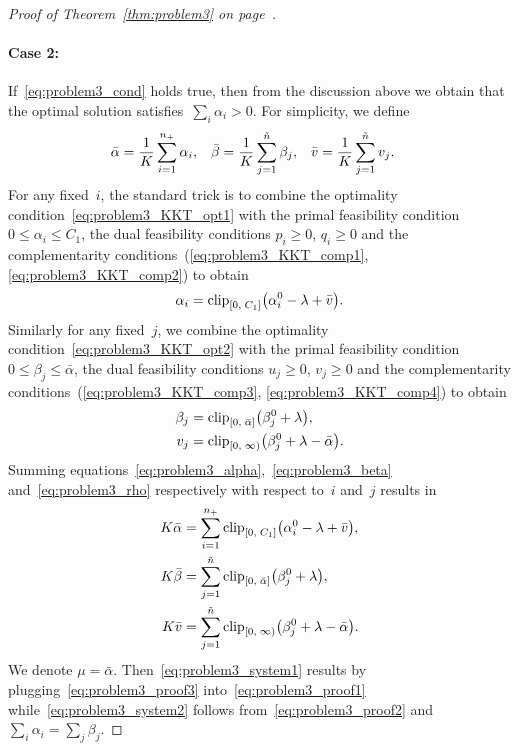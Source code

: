 \begin{proof}[Proof of Theorem~\ref{thm:problem3} on page~\pageref{thm:problem3}]
  \paragraph*{Case 2:} If~\eqref{eq:problem3_cond} holds true, then from the discussion above we obtain that the optimal solution satisfies~$\sum_i \alpha_i > 0$. For simplicity, we define
  \begin{align*}
    \bar{\alpha} & = \frac{1}{K} \sum_{i=1}^{n_{+}} \alpha_i, &
    \bar{\beta} & = \frac{1}{K} \sum_{j=1}^{\tilde{n}} \beta_j, &
    \bar{v} & = \frac{1}{K} \sum_{j=1}^{\tilde{n}} v_j.
  \end{align*}
  For any fixed~$i$, the standard trick is to combine the optimality condition~\eqref{eq:problem3_KKT_opt1} with the primal feasibility condition~$0 \le \alpha_i \le C_1$, the dual feasibility conditions $p_i \ge 0$, $q_i \ge 0$ and the complementarity conditions~(\ref{eq:problem3_KKT_comp1}, \ref{eq:problem3_KKT_comp2}) to obtain
  \begin{equation}\label{eq:problem3_alpha}
    \alpha_i = \clip{0}{C_1}{\alpha_i^0 - \lambda + \bar{v}}.
  \end{equation}
  Similarly for any fixed~$j$, we combine the optimality condition~\eqref{eq:problem3_KKT_opt2} with the primal feasibility condition~$0 \le \beta_j \le \bar{\alpha}$, the dual feasibility conditions $u_j \ge 0$, $v_j \ge 0$ and the complementarity conditions~(\ref{eq:problem3_KKT_comp3}, \ref{eq:problem3_KKT_comp4}) to obtain
  \begin{align}
    \beta_j
      & = \clip{0}{\bar{\alpha}}{\beta_j^0 + \lambda}, \label{eq:problem3_beta} \\
    v_j
      & = \clip[u]{0}{\infty}{\beta_j^0 + \lambda - \bar{\alpha}}. \label{eq:problem3_rho}
  \end{align}
  Summing equations~\eqref{eq:problem3_alpha},~\eqref{eq:problem3_beta} and~\eqref{eq:problem3_rho} respectively with respect to~$i$ and~$j$ results in
  \begin{subequations}
    \begin{align}
      K \bar{\alpha}
        & = \sum_{i=1}^{\npos}\clip{0}{C_1}{\alpha_i^0 - \lambda + \bar{v}},
        \label{eq:problem3_proof1} \\
      K \bar{\beta}
        &= \sum_{j=1}^{\ntil} \clip{0}{\bar{\alpha}}{\beta_j^0 + \lambda},
        \label{eq:problem3_proof2} \\
      K \bar{v}
        & = \sum_{j=1}^{\ntil} \clip[u]{0}{\infty}{\beta_j^0 + \lambda - \bar{\alpha}}.
        \label{eq:problem3_proof3}
    \end{align}
  \end{subequations}
  We denote $\mu = \bar{\alpha}$. Then~\eqref{eq:problem3_system1} results by plugging~\eqref{eq:problem3_proof3} into~\eqref{eq:problem3_proof1} while~\eqref{eq:problem3_system2} follows from~\eqref{eq:problem3_proof2} and $\sum_i \alpha_i = \sum_j \beta_j$. 
\end{proof}

